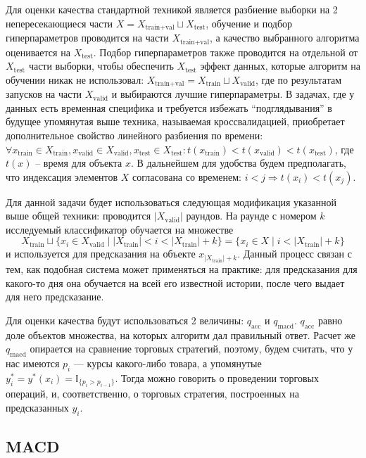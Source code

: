 \documentclass[pdftex,ptm,14pt,a4paper]{report}
\begin{document}
Для оценки качества стандартной техникой является разбиение выборки на 2 непересекающиеся части
$X = X_\text{train+val} \sqcup X_\text{test}$, обучение и подбор гиперпараметров проводится на части $X_\text{train+val}$,
а качество выбранного алгоритма оценивается на $X_\text{test}$.
Подбор гиперпараметров также проводится на отдельной от $X_\text{test}$ части выборки, чтобы обеспечить $X_\text{test}$ эффект
данных, которые алгоритм на обучении никак не использовал:
$X_\text{train+val} = X_\text{train} \sqcup X_\text{valid}$, где по результатам
запусков на части $X_\text{valid}$ и выбираются лучшие гиперпараметры.
В задачах, где у данных есть временная специфика и требуется избежать ``подглядывания'' в будущее упомянутая выше техника,
называемая кроссвалидацией, приобретает дополнительное свойство линейного разбиения по времени: $\forall x_\text{train}\in X_\text{train}, x_\text{valid}\in X_\text{valid}, x_\text{test}\in X_\text{test}:
t(x_\text{train} ) < t(x_\text{valid} ) < t(x_\text{test} )$, где $t(x)$ -- время для объекта $x$.
В дальнейшем для удобства будем предполагать, что индексация элементов $X$ согласована со временем:
$i<j\Rightarrow t(x_i)<t(x_j)$.

Для данной задачи будет использоваться следующая модификация указанной выше общей техники: проводится
$|X_\text{valid}|$ раундов. На раунде с номером $k$ исследуемый классификатор обучается на множестве
\[X_\text{train} \sqcup \{x_i \in X_\text{valid} \mid |X_\text{train}| < i < |X_\text{train}| + k\} =
\{x_i\in X \mid i < |X_\text{train}| + k\} \]
и используется для предсказания на объекте $x_{|X_\text{train}|+k}$. Данный процесс связан с тем, как подобная система
может применяться на практике: для предсказания для какого-то дня она обучается на всей его известной истории, после чего
выдает для него предсказание.

Для оценки качества будут использоваться 2 величины: $q_\text{acc}$ и $q_\text{macd}$. $q_\text{acc}$ равно доле объектов
множества, на которых алгоритм дал правильный ответ. Расчет же $q_\text{macd}$ опирается на сравнение торговых стратегий,
поэтому, будем считать, что у нас имеются $p_i$ --- курсы какого-либо товара, а упомянутые
$y^*_i=y^*(x_i)=\mathbb{I}_{\{p_i > p_{i-1}\}}$.
Тогда можно говорить о проведении торговых операций, и, соответственно, о торговых стратегия, построенных на предсказанных $y_i$.

\subsection{MACD}
\end{document}
